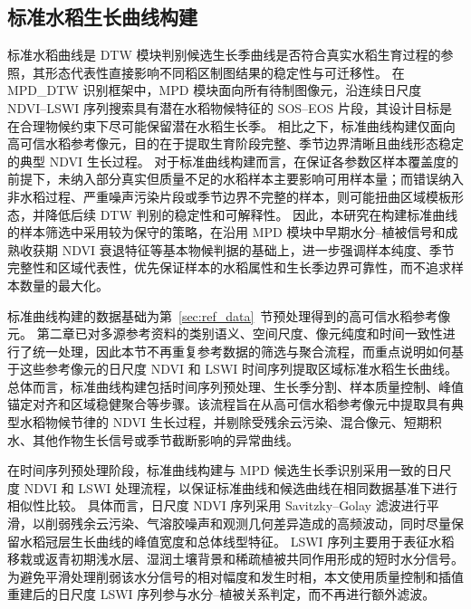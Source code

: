 \subsection{标准水稻生长曲线构建}
标准水稻曲线是 DTW 模块判别候选生长季曲线是否符合真实水稻生育过程的参照，其形态代表性直接影响不同稻区制图结果的稳定性与可迁移性。
在 MPD\_DTW 识别框架中，MPD 模块面向所有待制图像元，沿连续日尺度 NDVI--LSWI 序列搜索具有潜在水稻物候特征的 SOS--EOS 片段，其设计目标是在合理物候约束下尽可能保留潜在水稻生长季。
相比之下，标准曲线构建仅面向高可信水稻参考像元，目的在于提取生育阶段完整、季节边界清晰且曲线形态稳定的典型 NDVI 生长过程。
对于标准曲线构建而言，在保证各参数区样本覆盖度的前提下，未纳入部分真实但质量不足的水稻样本主要影响可用样本量；而错误纳入非水稻过程、严重噪声污染片段或季节边界不完整的样本，则可能扭曲区域模板形态，并降低后续 DTW 判别的稳定性和可解释性。
因此，本研究在构建标准曲线的样本筛选中采用较为保守的策略，在沿用 MPD 模块中早期水分--植被信号和成熟收获期 NDVI 衰退特征等基本物候判据的基础上，进一步强调样本纯度、季节完整性和区域代表性，优先保证样本的水稻属性和生长季边界可靠性，而不追求样本数量的最大化。

标准曲线构建的数据基础为第~\ref{sec:ref_data}~节预处理得到的高可信水稻参考像元。
第二章已对多源参考资料的类别语义、空间尺度、像元纯度和时间一致性进行了统一处理，因此本节不再重复参考数据的筛选与聚合流程，而重点说明如何基于这些参考像元的日尺度 NDVI 和 LSWI 时间序列提取区域标准水稻生长曲线。
总体而言，标准曲线构建包括时间序列预处理、生长季分割、样本质量控制、峰值锚定对齐和区域稳健聚合等步骤。该流程旨在从高可信水稻参考像元中提取具有典型水稻物候节律的 NDVI 生长过程，并剔除受残余云污染、混合像元、短期积水、其他作物生长信号或季节截断影响的异常曲线。


在时间序列预处理阶段，标准曲线构建与 MPD 候选生长季识别采用一致的日尺度 NDVI 和 LSWI 处理流程，以保证标准曲线和候选曲线在相同数据基准下进行相似性比较。
具体而言，日尺度 NDVI 序列采用 Savitzky--Golay 滤波进行平滑，以削弱残余云污染、气溶胶噪声和观测几何差异造成的高频波动，同时尽量保留水稻冠层生长曲线的峰值宽度和总体线型特征\cite{Chen2004RSE}。
LSWI 序列主要用于表征水稻移栽或返青初期浅水层、湿润土壤背景和稀疏植被共同作用形成的短时水分信号。为避免平滑处理削弱该水分信号的相对幅度和发生时相，本文使用质量控制和插值重建后的日尺度 LSWI 序列参与水分--植被关系判定，而不再进行额外滤波。

